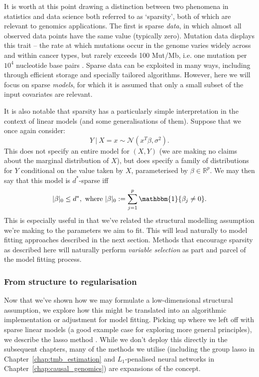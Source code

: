 \documentclass[thesis.tex]{subfiles}
\begin{document}
It is worth at this point drawing a distinction between two phenomena in statistics and data science both referred to as `sparsity', both of which are relevant to genomics applications. The first is sparse \textit{data}, in which almost all observed data points have the same value (typically zero). Mutation data displays this trait -- the rate at which mutations occur in the genome varies widely across and within cancer types, but rarely exceeds 100 Mut/Mb, i.e. one mutation per $10^4$ nucleotide base pairs \citep{chalmers_analysis_2017}. Sparse data can be exploited in many ways, including through efficient storage and specially tailored algorithms. However, here we will focus on sparse \textit{models}, for which it is assumed that only a small subset of the input covariates are relevant. 

It is also notable that sparsity has a particularly simple interpretation in the context of linear models (and some generalisations of them). Suppose that we once again consider:
\[Y \ | \ X=x \sim \mathcal{N}(x^T\beta, \sigma^2). \]
This does not specify an entire model for $(X, Y)$ (we are making no claims about the marginal distribution of $X$), but does specify a family of distributions for $Y$ conditional on the value taken by $X$, parameterised by $\beta \in \mathbb{R}^p$. We may then say that this model is $d^*$-sparse iff
\[|\beta|_0 \leq d^*, \ \text{where} \ |\beta|_0 := \sum_{j=1}^p \mathbbm{1}\{\beta_j \neq 0\}.\]
This is especially useful in that we've related the structural modelling assumption we're making to the parameters we aim to fit. This will lead naturally to model fitting approaches described in the next section. Methods that encourage sparsity as described here will naturally perform \emph{variable selection} as part and parcel of the model fitting process.

\subsubsection{From structure to regularisation}

Now that we've shown how we may formulate a low-dimensional structural assumption, we explore how this might be translated into an algorithmic implementation or adjustment for model fitting. Picking up where we left off with sparse linear models (a good example case for exploring more general principles), we describe the \gls{lasso} method \citep{tibshirani_regression_1996}. While we don't deploy this directly in the subsequent chapters, many of the methods we utilise (including the group \gls{lasso} in Chapter~\ref{chap:tmb_estimation} and $L_1$-penalised neural networks in Chapter~\ref{chap:causal_genomics}) are expansions of the concept.
\end{document}
